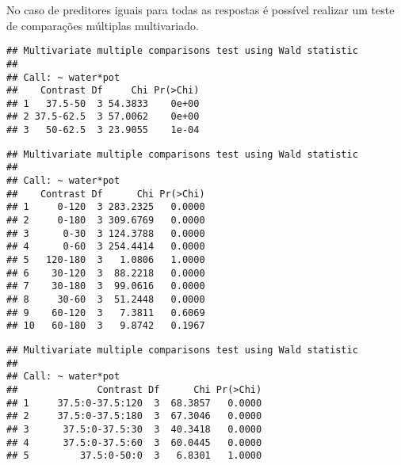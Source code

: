 No caso de preditores iguais para todas as respostas é possível realizar um teste de comparações múltiplas multivariado.

\begin{knitrout}
\color{fgcolor}\begin{kframe}
\begin{alltt}
\hlstd{(} 
                  \hlstd{=} \hlstd{(}\hlstd{),}
                  
\end{alltt}
\begin{verbatim}
## Multivariate multiple comparisons test using Wald statistic
## 
## Call: ~ water*pot
##    Contrast Df     Chi Pr(>Chi)
## 1   37.5-50  3 54.3833    0e+00
## 2 37.5-62.5  3 57.0062    0e+00
## 3   50-62.5  3 23.9055    1e-04
\end{verbatim}
\begin{alltt}
\hlstd{(} 
                  \hlstd{=} \hlstd{(}\hlstd{),}
                  
\end{alltt}
\begin{verbatim}
## Multivariate multiple comparisons test using Wald statistic
## 
## Call: ~ water*pot
##    Contrast Df      Chi Pr(>Chi)
## 1     0-120  3 283.2325   0.0000
## 2     0-180  3 309.6769   0.0000
## 3      0-30  3 124.3788   0.0000
## 4      0-60  3 254.4414   0.0000
## 5   120-180  3   1.0806   1.0000
## 6    30-120  3  88.2218   0.0000
## 7    30-180  3  99.0616   0.0000
## 8     30-60  3  51.2448   0.0000
## 9    60-120  3   7.3811   0.6069
## 10   60-180  3   9.8742   0.1967
\end{verbatim}
\begin{alltt}
\hlstd{(} 
                  \hlstd{=} \hlstd{(}\hlstd{,} \hlstd{),}
                  
\end{alltt}
\begin{verbatim}
## Multivariate multiple comparisons test using Wald statistic
## 
## Call: ~ water*pot
##              Contrast Df      Chi Pr(>Chi)
## 1     37.5:0-37.5:120  3  68.3857   0.0000
## 2     37.5:0-37.5:180  3  67.3046   0.0000
## 3      37.5:0-37.5:30  3  40.3418   0.0000
## 4      37.5:0-37.5:60  3  60.0445   0.0000
## 5         37.5:0-50:0  3   6.8301   1.0000

\end{verbatim}
\end{kframe}
\end{knitrout}
